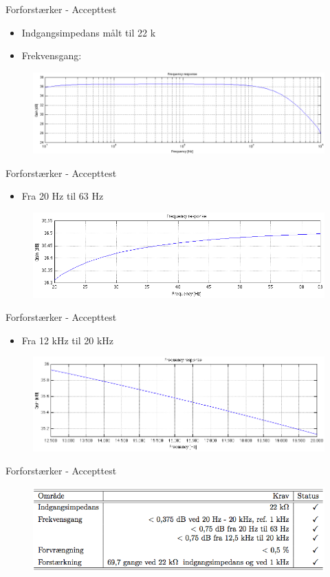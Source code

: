 \begin{frame}{Forforstærker - Accepttest}
\begin{itemize}
\item Indgangsimpedans målt til 22 k\ohm
\item Frekvensgang: 
\end{itemize}
\begin{figure}[h]
\centering
\includegraphics[scale=.25]{images/frekvensrespons-forforstaerker.png}
\end{figure}

\end{frame}

\begin{frame}{Forforstærker - Accepttest}
\begin{itemize}
\item Fra 20 Hz til 63 Hz
\end{itemize}
\begin{figure}[h]
\centering
\includegraphics[scale=.3]{images/fr20-63.png}
\end{figure}
\end{frame}

\begin{frame}{Forforstærker - Accepttest}
\begin{itemize}
\item Fra 12 kHz til 20 kHz
\end{itemize}
\begin{figure}[h]
\centering
\includegraphics[scale=.3]{images/fr12-20k.png}
\end{figure}
\end{frame}

\begin{frame}{Forforstærker - Accepttest}
\begin{figure}[h]
\centering
\includegraphics[scale=.3]{images/forforstaerker-konklusion.png}
\end{figure}
\end{frame}
